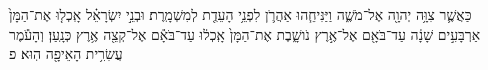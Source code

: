 \documentclass{openreader}
\begin{document}
כַּאֲשֶׁ֛ר צִוָּ֥ה יְהוָ֖ה אֶל־מֹשֶׁ֑ה וַיַּנִּיחֵ֧הוּ אַהֲרֹ֛ן לִפְנֵ֥י הָעֵדֻ֖ת לְמִשְׁמָֽרֶת׃ 
וּבְנֵ֣י יִשְׂרָאֵ֗ל אָֽכְל֤וּ אֶת־הַמָּן֙ אַרְבָּעִ֣ים שָׁנָ֔ה עַד־בֹּאָ֖ם אֶל־אֶ֣רֶץ נֹושָׁ֑בֶת אֶת־הַמָּן֙ אָֽכְל֔וּ עַד־בֹּאָ֕ם אֶל־קְצֵ֖ה אֶ֥רֶץ כְּנָֽעַן׃ 
וְהָעֹ֕מֶר עֲשִׂרִ֥ית הָאֵיפָ֖ה הֽוּא׃ פ 
\end{document}

